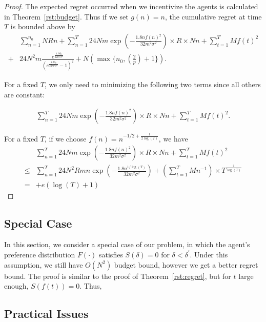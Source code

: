 \documentclass{article}
\begin{document}
\begin{proof}
The expected regret occurred when we incentivize the agents is calculated in Theorem~\ref{rst:budget}. Thus if we set $g(n)=n$, the cumulative regret at time $T$ is bounded above by
\begin{align}
&\sum_{n=1}^{n_{0}}NRn + \sum_{n=1}^{T} 24Nm\exp\left(-\frac{1.8n f(n)^2}{32 m^2\sigma^2}\right)\times R \times Nn+ \sum_{t=1}^{T}Mf(t)^2 \nonumber \\
+ & 24N^2 m \frac{e^{\frac{1.8\delta_{0}}{32m^2\sigma^2}}}{(e^{\frac{1.8\delta_{0}}{32m^2\sigma^2}}-1)^2}+N(\max\{n_{0},(\frac{2}{p})+1\}). \nonumber
\end{align}

For a fixed $T$, we only need to minimizing the following two terms since all others are constant:

\begin{align}
\sum_{n=1}^{T} 24Nm\exp\left(-\frac{1.8n f(n)^2}{32 m^2\sigma^2}\right)\times R \times Nn+ \sum_{t=1}^{T}Mf(t)^2.
\end{align}

For a fixed $T$, if we choose $f(n)=n^{-1/2+\frac{1}{2\log(T)}}$, we have
\begin{align}
&\sum_{n=1}^{T} 24Nm\exp\left(-\frac{1.8n f(n)^2}{32 m^2\sigma^2}\right)\times R \times Nn+ \sum_{t=1}^{T}Mf(t)^2 \nonumber \\
\leq & \sum_{n=1}^{T} 24N^{2} Rmn\exp\left(-\frac{1.8n^{1/\log(T)}}{32 m^2\sigma^2}\right) + \left(\sum_{t=1}^{T} Mn^{-1}\right) \times T^{\frac{1}{\log(T)}} \nonumber \\
= & + e(\log(T) + 1)
\end{align}

\end{proof}


\subsection{Special Case}

In this section, we consider a special case of our problem, in which the agent's preference distribution $F(\cdot)$ satisfies $S(\delta)=0$ for $\delta<\delta^{'}$. Under this assumption, we still have $O(N^2)$ budget bound, however we get a better regret bound. The proof is similar to the proof of Theorem~\ref{rst:regret}, but for $t$ large enough, $S(f(t))=0$. Thus,

\subsection{Practical Issues}
\end{document}
